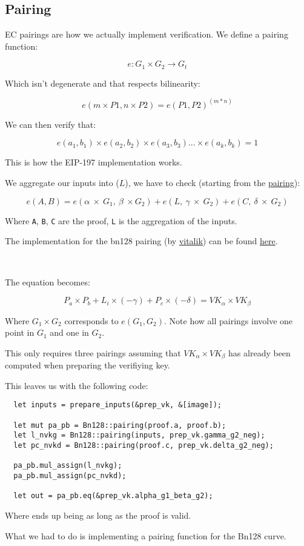 \documentclass{article}
\begin{document}
\subsection{Pairing}

EC pairings are how we actually implement verification. We define a pairing function:

\[ e: G_1 \times  G_2 \rightarrow G_t \]

Which isn't degenerate and that respects bilinearity:

\[ e ( m \times P1, n \times P2) = e ( P1, P2 ) ^ ( m * n ) \]

We can then verify that:

\[ e ( a_1, b_1) \times e ( a_2, b_2 ) \times e ( a_3, b_3 ) ... \times e ( a_k, b_k ) = 1 \]

This is how the EIP-197 implementation works.

We aggregate our inputs into (\(L\)), we have to check (starting from the \href{https://xn--2-umb.com/22/pairings/index.html}{pairing}):

\[ e(A, B) = e(\alpha \ \times \ G_1, \ \beta \ \times G_2) + e(L, \ \gamma \ \times \ G_2) + e(C, \ \delta \ \times \ G_2)\]

Where \texttt{A}, \texttt{B}, \texttt{C} are the proof, \texttt{L} is the aggregation of the inputs.

The implementation for the bn128 pairing (by \href{https://vitalik.ca}{vitalik}) can be found \href{https://github.com/ethereum/py_pairing/blob/master/py_ecc/bn128/bn128_pairing.py#L68}{here}.

\

The equation becomes:

\[ P_a \times P_b + L_i \times ( - \gamma ) + P_c \times ( - \delta ) = VK_{\alpha} \times VK_{\beta} \]

Where \( G_1 \times G_2 \) corresponds to \( e ( G_1 , G_2 ) \). Note how all pairings involve one point in \( G_1 \) and one in \( G_2 \).

This only requires three pairings assuming that \( VK_{\alpha} \times VK_{\beta} \) has already been computed when preparing the verifiying key.

This leaves us with the following code:

\begin{lstlisting}
  let inputs = prepare_inputs(&prep_vk, &[image]);

  let mut pa_pb = Bn128::pairing(proof.a, proof.b);
  let l_nvkg = Bn128::pairing(inputs, prep_vk.gamma_g2_neg);
  let pc_nvkd = Bn128::pairing(proof.c, prep_vk.delta_g2_neg);

  pa_pb.mul_assign(l_nvkg);
  pa_pb.mul_assign(pc_nvkd);

  let out = pa_pb.eq(&prep_vk.alpha_g1_beta_g2);
\end{lstlisting}

Where  ends up being  as long as the proof is valid.

What we had to do is implementing a pairing function for the Bn128 curve. 
\end{document}
